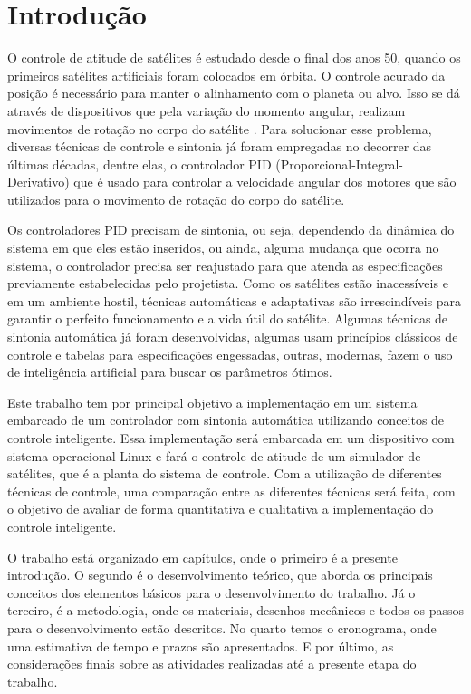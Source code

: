 \chapter[Introdução]{Introdução}

O controle de atitude de satélites é estudado desde o final dos anos 50, quando os primeiros satélites artificiais foram colocados em órbita. O controle acurado da posição é necessário para manter o alinhamento com o planeta ou alvo. Isso se dá através de dispositivos que pela variação do momento angular, realizam movimentos de rotação no corpo do satélite . Para solucionar esse problema, diversas técnicas de controle e sintonia já foram empregadas no decorrer das últimas décadas, dentre elas, o controlador PID (Proporcional-Integral-Derivativo) que é usado para controlar a velocidade angular dos motores que são utilizados para o movimento de rotação do corpo do satélite.

Os controladores PID precisam de sintonia, ou seja, dependendo da dinâmica do sistema em que eles estão inseridos, ou ainda, alguma mudança que ocorra no sistema, o controlador precisa ser reajustado para que atenda as especificações previamente estabelecidas pelo projetista. Como os satélites estão inacessíveis e em um ambiente hostil, técnicas automáticas e adaptativas são irrescindíveis para garantir o perfeito funcionamento e a vida útil do satélite. Algumas técnicas de sintonia automática já foram desenvolvidas, algumas usam princípios clássicos de controle e tabelas para especificações engessadas, outras, modernas, fazem o uso de inteligência artificial para buscar os parâmetros ótimos.


Este trabalho tem por principal objetivo a implementação em um sistema embarcado de um controlador com sintonia automática utilizando conceitos de controle inteligente. Essa implementação será embarcada em um dispositivo com sistema operacional Linux e fará o controle de atitude de um simulador de satélites, que é a planta do sistema de controle. Com a utilização de diferentes técnicas de controle, uma comparação entre as diferentes técnicas será feita, com o objetivo de avaliar de forma quantitativa e qualitativa a implementação do controle inteligente.

O trabalho está organizado em capítulos, onde o primeiro é a presente introdução. O segundo é o desenvolvimento teórico, que aborda os principais conceitos dos elementos básicos para o desenvolvimento do trabalho. Já o terceiro, é a metodologia, onde os materiais, desenhos mecânicos e todos os passos para o desenvolvimento estão descritos. No quarto temos o cronograma, onde uma estimativa de tempo e prazos são apresentados. E por último, as considerações finais sobre as atividades realizadas até a presente etapa do trabalho.











